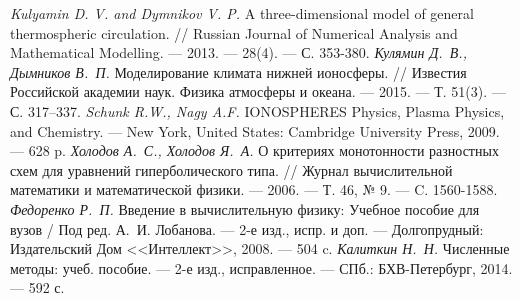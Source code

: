 \documentclass[14pt, a4paper, fleqn]{extarticle}
\begin{document}
\begin{thebibliography}{00}
\textit{Kulyamin D. V. and Dymnikov V. P.} A three-dimensional model of general thermospheric circulation. // Russian Journal of Numerical Analysis and Mathematical Modelling. --- 2013. --- 28(4). --- С. 353-380.
\textit{Кулямин Д.~В., Дымников В.~П.} Моделирование климата нижней ионосферы. // Известия Российской академии наук. Физика атмосферы и океана. --- 2015. --- Т. 51(3). --- С. 317–337.
\textit{Schunk R.W., Nagy A.F.} IONOSPHERES Physics, Plasma Physics, and Chemistry. --- New York, United States: Cambridge University Press, 2009. --- 628 p.
\textit{Холодов А.~С., Холодов Я.~А.} О критериях монотонности разностных схем для уравнений гиперболического типа. // Журнал вычислительной математики и математической физики. --- 2006. --- Т. 46, № 9. --- C. 1560-1588.
\textit{Федоренко Р.~П.} Введение в вычислительную физику: Учебное пособие для вузов / Под ред. А.~И. Лобанова. --- 2-е изд., испр. и доп. --- Долгопрудный: Издательский Дом <<Интеллект>>, 2008. --- 504 c.
\textit{Калиткин Н.~Н.} Численные методы: учеб. пособие. --- 2-е изд., исправленное. --- СПб.: БХВ-Петербург, 2014. --- 592 с.
\end{thebibliography}
\end{document}
